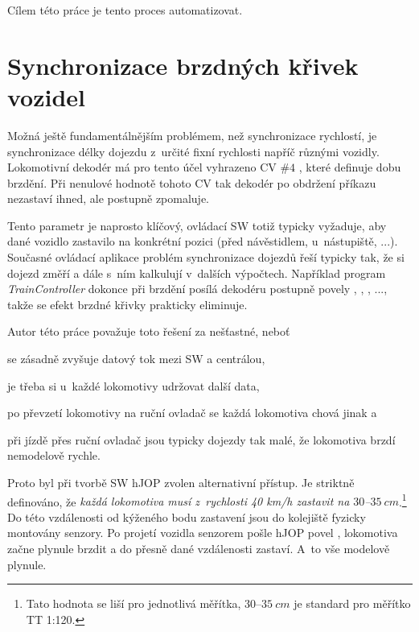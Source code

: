 Cílem této práce je tento proces automatizovat.

\section{Synchronizace brzdných křivek vozidel}
\label{sec:sync-krivky}

Možná ještě fundamentálnějším problémem, než synchronizace rychlostí, je
synchronizace délky dojezdu z~určité fixní rychlosti napříč různými vozidly.
Lokomotivní dekodér má pro tento účel vyhrazeno CV $\#4$ \cite{zimo:cvs}, které
definuje dobu brzdění. Při nenulové hodnotě tohoto CV tak dekodér po obdržení
příkazu  nezastaví ihned, ale postupně zpomaluje.

Tento parametr je naprosto klíčový, ovládací SW totiž typicky vyžaduje, aby dané
vozidlo zastavilo na konkrétní pozici (před návěstidlem, u~nástupiště, ...).
Současné ovládací aplikace problém synchronizace dojezdů řeší typicky tak, že si
dojezd změří a dále s~ním kalkulují v~dalších výpočtech. Například program
\textit{TrainController} \cite{traincontroller:web} dokonce při brzdění
posílá dekodéru postupně povely , ,
, ..., takže se efekt brzdné křivky prakticky eliminuje.

Autor této práce považuje toto řešení za nešťastné, neboť
\begin{compactenum}
\item se zásadně zvyšuje datový tok mezi SW a centrálou,
\item je třeba si u~každé lokomotivy udržovat další data,
\item po převzetí lokomotivy na ruční ovladač se každá lokomotiva chová jinak a
\item při jízdě přes ruční ovladač jsou typicky dojezdy tak malé, že lokomotiva
      brzdí nemodelově rychle.
\end{compactenum}

Proto byl při tvorbě SW hJOP zvolen alternativní přístup. Je striktně
definováno, že \textit{každá lokomotiva musí z~rychlosti 40 km/h zastavit na
$30$--$35\ cm$}.\footnote{Tato hodnota se liší pro jednotlivá měřítka,
$30$--$35\ cm$ je standard pro měřítko TT 1:120.} Do této vzdálenosti od
kýženého bodu zastavení jsou do kolejiště fyzicky montovány senzory. Po
projetí vozidla senzorem pošle hJOP povel ,
lokomotiva začne plynule brzdit a do přesně dané vzdálenosti zastaví. A~to vše
modelově plynule.

